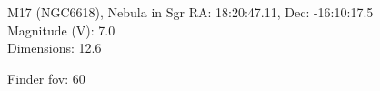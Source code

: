 \begin{block}{M17 (NGC6618), Nebula in Sgr}
    RA: 18:20:47.11, Dec: -16:10:17.5 \\ 
    Magnitude (V): 7.0 \\ 
    Dimensions: 12.6 

    Finder fov: 60 
\end{block}